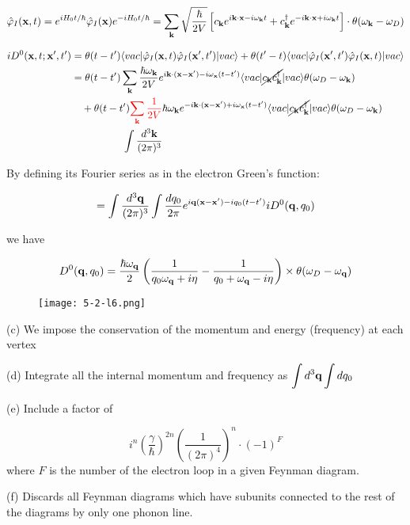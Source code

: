 \[\hat\varphi_I({\bf x},t) = e^{iH_0t/\hbar}\hat\varphi_I({\bf x})e^{-iH_0t/\hbar} = \sum_{\bf k}\sqrt{\frac{\hbar}{2V}}\left[c_{\bf k}e^{i{\bf k\cdot x} - i\omega_{\bf k}t} + c_{\bf k}^\dagger e^{-i{\bf k\cdot x} + i\omega_{\bf k}t}\right] \cdot\theta(\omega_{\bf k} - \omega_D)\]

\[\begin{split}
iD^0({\bf x},t;{\bf x'},t') &= \theta(t-t')\langle vac|\hat\varphi_I({\bf x},t)\hat\varphi_I({\bf x'},t')|vac\rangle + \theta(t'-t)\langle vac|\hat\varphi_I({\bf x'},t')\hat\varphi_I({\bf x},t)|vac\rangle\\
&= \theta(t-t')\sum_{\bf k}\frac{\hbar\omega_{\bf k}}{2V}e^{i{\bf k\cdot(x-x')}-i\omega_{\bf x}(t-t')}\langle vac|\cancel{c_{\bf k}c_{\bf k}^\dagger}|vac\rangle\theta(\omega_D-\omega_{\bf k})\\
&\ \ \  + \theta(t-t'){\color{red}{\sum_{\bf k}\frac{1}{2V}}}\hbar\omega_{\bf k}e^{-i{\bf k\cdot(x-x')}+i\omega_{\bf x}(t-t')}\langle vac|\cancel{c_{\bf k}c_{\bf k}^\dagger}|vac\rangle\theta(\omega_D-\omega_{\bf k})\\
&\quad\quad\quad\quad\quad\int \frac{d^3\bf k}{(2\pi)^3}\\
\end{split} \]

By defining its Fourier series as in the electron Green's function:

\[=\int \frac{d^3\bf q}{(2\pi)^3}\int \frac{d q_0}{2\pi}e^{i{\bf q(x-x')}-iq_0(t-t')}iD^0({\bf q},q_0) \]

we have

\[D^0({\bf q},q_0)=\frac{\hbar\omega_{\bf q}}{2}\left(\frac{1}{q_0\omega_{\bf q}+i\eta}-\frac{1}{q_0+\omega_{\bf q}-i\eta}\right)\times\theta(\omega_D-\omega_{\bf q}) \]

\begin{wrapfigure}{l}{3cm}
\texttt{[image: 5-2-l6.png]}
\end{wrapfigure}
\noindent (c) We impose the conservation of the momentum and energy (frequency) at each vertex

\noindent (d) Integrate all the internal momentum and frequency as $\displaystyle\int d^3{\bf q}\int dq_0$

\noindent (e) Include a factor of

\[i^n\left(\frac{\gamma}{\hbar}\right)^{2n}\left(\frac{1}{(2\pi)^4}\right)^n\cdot(-1)^F \]
where $F$ is the number of the electron loop in a given Feynman diagram.

\noindent (f) Discards all Feynman diagrams which have subunits connected to the rest of the diagrams by only one phonon line.

